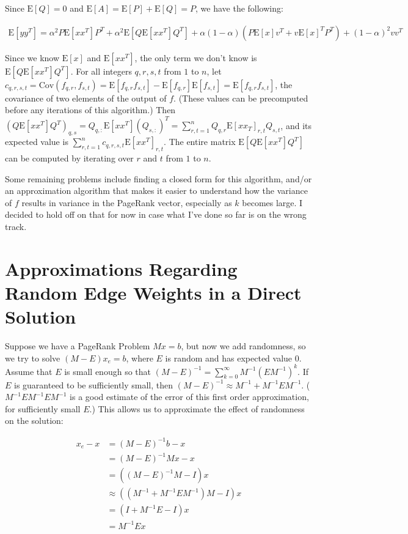 \documentclass{article}
\newcommand \E[1] {\mathrm E \left[#1\right]} %
\newcommand \Cov[2] {\mathrm {Cov} (#1, #2)} %
\newcommand \inv [1] {{#1}^{-1}} %
\begin{document}
Since $\E Q = 0$ and $\E A = \E P + \E Q = P$, we have the following:

\begin{align*}
\E{yy^T} = \alpha^2 P\E{xx^T}P^T + \alpha^2 \E{Q\E{xx^T}Q^T} + \alpha(1-\alpha)(P \E x v^T + v {\E x}^T P^T )+ (1-\alpha)^2 vv^T
\end{align*}

Since we know $\E x$ and $\E{xx^T}$, the only term we don't know is $\E{Q\E{xx^T}Q^T}$. For all integers $q,r,s,t$ from $1$ to $n$, let $c_{q,r,s,t} = \Cov{f_{q,r}}{f_{s,t}} = \E{f_{q,r}f_{s,t}}-\E{f_{q,r}}\E{f_{s,t}}=\E{f_{q,r}f_{s,t}}$, the covariance of two elements of the output of $f$. (These values can be precomputed before any iterations of this algorithm.) Then $(Q\E{xx^T}Q^T)_{q,s} = Q_{q,:}\E{xx^T}(Q_{s,:})^T = \sum_{r,t=1}^n Q_{q,r}\E{xx_T}_{r,t}Q_{s,t}$, and its expected value is $\sum_{r,t=1}^n c_{q,r,s,t}\E{xx^T}_{r,t}$. The entire matrix $\E{Q\E{xx^T}Q^T}$ can be computed by iterating over $r$ and $t$ from $1$ to $n$.

Some remaining problems include finding a closed form for this algorithm, and/or an approximation algorithm that makes it easier to understand how the variance of $f$ results in variance in the PageRank vector, especially as $k$ becomes large. I decided to hold off on that for now in case what I've done so far is on the wrong track.

\section{Approximations Regarding Random Edge Weights in a Direct Solution}

Suppose we have a PageRank Problem $Mx=b$, but now we add randomness, so we try to solve $(M-E)x_e = b$, where $E$ is random and has expected value 0. Assume that $E$ is small enough so that $(M-E)^{-1} = \sum_{k=0}^\infty \inv M (E\inv M)^k$. If $E$ is guaranteed to be sufficiently small, then $\inv{(M-E)} \approx \inv M + \inv M E \inv M$. ($\inv M E\inv M E\inv M$ is a good estimate of the error of this first order approximation, for sufficiently small $E$.) This allows us to approximate the effect of randomness on the solution:

\begin{align*}
x_e - x &= \inv{(M-E)}b - x\\
&= \inv{(M-E)}Mx - x\\
&= \left(\inv{(M-E)}M-I\right)x\\
&\approx \left((\inv M + \inv M E \inv M)M-I\right)x\\
&= (I + \inv M E - I)x\\
&= \inv M E x
\end{align*}
\end{document}
